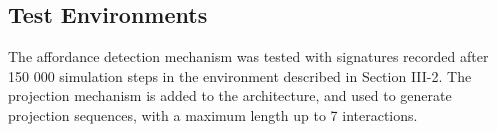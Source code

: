 \documentclass[conference]{IEEEtran}
\begin{document}






\subsection{Test Environments}

The affordance detection mechanism was tested with signatures recorded after 150 000 simulation steps in the environment described in Section III-2. The projection mechanism is added to the architecture, and used to generate projection sequences, with a maximum length up to 7 interactions.
\end{document}
